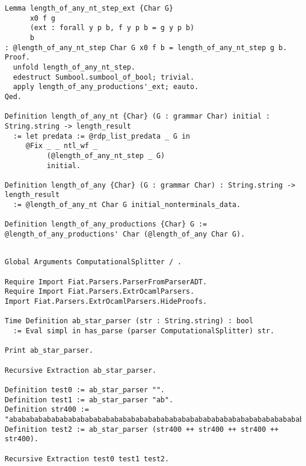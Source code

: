 \begin{verbatim}
Lemma length_of_any_nt_step_ext {Char G}
      x0 f g
      (ext : forall y p b, f y p b = g y p b)
      b
: @length_of_any_nt_step Char G x0 f b = length_of_any_nt_step g b.
Proof.
  unfold length_of_any_nt_step.
  edestruct Sumbool.sumbool_of_bool; trivial.
  apply length_of_any_productions'_ext; eauto.
Qed.

Definition length_of_any_nt {Char} (G : grammar Char) initial : String.string -> length_result
  := let predata := @rdp_list_predata _ G in
     @Fix _ _ ntl_wf _
          (@length_of_any_nt_step _ G)
          initial.

Definition length_of_any {Char} (G : grammar Char) : String.string -> length_result
  := @length_of_any_nt Char G initial_nonterminals_data.

Definition length_of_any_productions {Char} G := @length_of_any_productions' Char (@length_of_any Char G).


\end{verbatim}

\begin{verbatim}
Global Arguments ComputationalSplitter / .

Require Import Fiat.Parsers.ParserFromParserADT.
Require Import Fiat.Parsers.ExtrOcamlParsers.
Import Fiat.Parsers.ExtrOcamlParsers.HideProofs.

Time Definition ab_star_parser (str : String.string) : bool
  := Eval simpl in has_parse (parser ComputationalSplitter) str.

Print ab_star_parser.

Recursive Extraction ab_star_parser.

Definition test0 := ab_star_parser "".
Definition test1 := ab_star_parser "ab".
Definition str400 := "abababababababababababababababababababababababababababababababababababababababababababababababababababababababababababababababababababababababababababababababababababababababababababababababababababababababababababababababababababababababababababababababababababababababababababababababababababababababababababababababababababababababababababababababababababababababababababababababababababababababab".
Definition test2 := ab_star_parser (str400 ++ str400 ++ str400 ++ str400).

Recursive Extraction test0 test1 test2.

\end{verbatim}